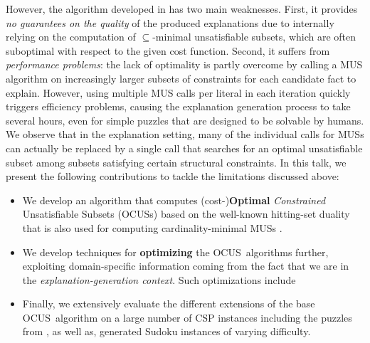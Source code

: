 \documentclass[a4paper,UKenglish,cleveref, autoref, thm-restate, pdfa]{lipics-v2021}
\renewcommand\comment[1]{#1}
\newcommand{\bart}[1]{{\comment{\color{OliveGreen}Bart: #1}}}
\newcommand\comus{\textsc{OCUS}}
\begin{document}
However, the algorithm developed in \cite{ecai/BogaertsGCG20} has two main weaknesses.
First, it provides \emph{no guarantees on the quality} of the produced explanations due to internally relying on the computation of $\subseteq$-minimal unsatisfiable subsets, which are often suboptimal with respect to the given cost function. 
Second, it suffers from \emph{performance problems}: the lack of optimality is partly overcome by calling a MUS algorithm on increasingly larger subsets of constraints for each candidate fact to explain.
However, using multiple MUS calls per literal in each iteration quickly triggers efficiency problems, causing the explanation generation process to take several hours, even for simple puzzles that are designed to be solvable by humans.
We observe that in the explanation setting, many of the individual calls for MUSs can actually be replaced by a single call that searches for an optimal unsatisfiable subset among subsets satisfying certain structural constraints.
In this talk, we present the following contributions to tackle the limitations discussed above:
\begin{itemize}

	\item We develop an algorithm that computes (cost-)\textbf{Optimal} \emph{Constrained} Unsatisfiable Subsets (\comus{s}) based on the well-known hitting-set duality that is also used for computing cardinality-minimal MUSs \cite{ignatiev2015smallest,DBLP:conf/kr/SaikkoWJ16}.

	\item We develop techniques for \textbf{optimizing} the \comus~algorithms further, exploiting domain-specific information coming from the fact that we are in the \emph{explanation-generation context}. Such optimizations include 
\item Finally, we extensively evaluate the different extensions of the base \comus~algorithm on a large number of CSP instances including the puzzles from \cite{ecai/BogaertsGCG20,hoffmann2019explainable}, as well as, generated Sudoku instances of varying difficulty.
\end{itemize}
\end{document}
